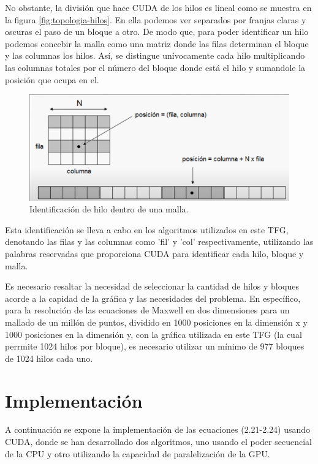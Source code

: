 \documentclass[11pt,a4paper,twoside,pdf]{article}
\numberwithin{equation}{section}
\begin{document}
No obstante, la división que hace CUDA de los hilos es lineal como se muestra en la figura \ref{fig:topologia-hilos}. En ella podemos ver separados por franjas claras y oscuras el paso de un bloque a otro. De modo que, para poder identificar un hilo podemos concebir la malla como una matriz donde las filas determinan el bloque y las columnas los hilos. Así, se distingue unívocamente cada hilo multiplicando las columnas totales por el número del bloque donde está el hilo y sumandole la posición que ocupa en el.

\begin{figure}[h]
\centering
\includegraphics[width=10 cm]{Nvidia_Posicion_hilo.jpg}				
\caption{Identificación de hilo dentro de una malla.}
\end{figure}
\noindent

Esta identificación se lleva a cabo en los algoritmos utilizados en este TFG, denotando las filas y las columnas como 'fil' y 'col' respectivamente, utilizando las palabras reservadas que proporciona CUDA para identificar cada hilo, bloque y malla.

Es necesario resaltar la necesidad de seleccionar la cantidad de hilos y bloques acorde a la capidad de la gráfica y las necesidades del problema. En específico, para la resolución de las ecuaciones de Maxwell en dos dimensiones para un mallado de un millón de puntos, dividido en 1000 posiciones en la dimensión x y 1000 posiciones en la dimensión y, con la gráfica utilizada en este TFG (la cual perrmite 1024 hilos por bloque), es necesario utilizar un mínimo de 977 bloques de 1024 hilos cada uno.

\newpage

\section{Implementación}

A continuación se expone la implementación de las ecuaciones (2.21-2.24) usando CUDA, donde se han desarrollado dos algoritmos, uno usando el poder secuencial de la CPU y otro utilizando la capacidad de paralelización de la GPU. 
\end{document}
